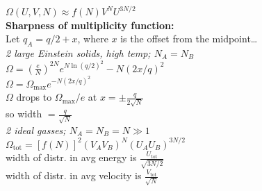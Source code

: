 \documentclass[letterpaper,landscape,10pt]{article}
\begin{document}
{\begin{multicols}{4}
	\hspace{10pt} $\Omega(U,V,N) \approx f(N) V^N U^{3N/2}$ \\
	\textbf{Sharpness of multiplicity function:} \\
	\hspace{10pt}Let $q_A = q/2 + x$, where $x$ is the offset from the midpoint\dots \\
	\vspace{2.5pt}
	\hspace{5pt} \emph{2 large Einstein solids, high temp; $N_A=N_B$} \\
	\hspace{10pt} $\Omega = \left( \frac{e}{N} \right)^{2N}e^{N\ln\left( q/2 \right)^2}-N\left( 2x/q \right)^2$ \\
	\hspace{10pt} $\Omega = \Omega_{\textrm{max}}e^{-N\left( 2x/q \right)^2}$ \\
	\hspace{10pt} $\Omega$ drops to $\Omega_{\textrm{max}}/e$ at $x = \pm\frac{q}{2\sqrt{N}}$ \\
	\hspace{10pt} so width $=\frac{q}{\sqrt{N}}$ \\
	\hspace{5pt} \emph{2 ideal gasses; $N_A=N_B=N\gg 1$} \\
	\hspace{10pt} $\Omega_{\textrm{tot}} = \left[ f(N) \right]^2\left( V_AV_B \right)^N\left( U_AU_B \right)^{3N/2}$ \\
	\hspace{10pt} width of distr. in avg energy is $\frac{U_{\textrm{tot}}}{\sqrt{3N/2}}$ \\
	\hspace{10pt} width of distr. in avg velocity is $\frac{V_{\textrm{tot}}}{\sqrt{N}}$ \\





\end{multicols}}
\end{document}
